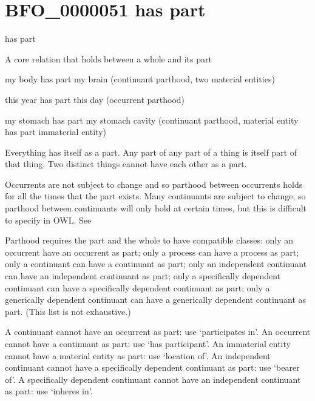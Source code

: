 \documentclass[letterpaper,10pt,english]{sphinxmanual}
\begin{document}
\section{BFO\_0000051 \sphinxhyphen{} has part}
\label{\detokenize{doc-BFO_0000051:bfo-0000051-has-part}}\label{\detokenize{doc-BFO_0000051:index-0}}\label{\detokenize{doc-BFO_0000051::doc}}
\begin{sphinxShadowBox}

\sphinxAtStartPar
has part
\end{sphinxShadowBox}

\begin{sphinxShadowBox}

\sphinxAtStartPar
A core relation that holds between a whole and its part
\end{sphinxShadowBox}

\begin{sphinxShadowBox}

\sphinxAtStartPar
my body has part my brain (continuant parthood, two material entities)

\sphinxAtStartPar
this year has part this day (occurrent parthood)

\sphinxAtStartPar
my stomach has part my stomach cavity (continuant parthood, material entity has part immaterial entity)
\end{sphinxShadowBox}

\begin{sphinxShadowBox}

\sphinxAtStartPar
Everything has itself as a part. Any part of any part of a thing is itself part of that thing. Two distinct things cannot have each other as a part.

\sphinxAtStartPar
Occurrents are not subject to change and so parthood between occurrents holds for all the times that the part exists. Many continuants are subject to change, so parthood between continuants will only hold at certain times, but this is difficult to specify in OWL. See 

\sphinxAtStartPar
Parthood requires the part and the whole to have compatible classes: only an occurrent have an occurrent as part; only a process can have a process as part; only a continuant can have a continuant as part; only an independent continuant can have an independent continuant as part; only a specifically dependent continuant can have a specifically dependent continuant as part; only a generically dependent continuant can have a generically dependent continuant as part. (This list is not exhaustive.)

\sphinxAtStartPar
A continuant cannot have an occurrent as part: use ‘participates in’. An occurrent cannot have a continuant as part: use ‘has participant’. An immaterial entity cannot have a material entity as part: use ‘location of’. An independent continuant cannot have a specifically dependent continuant as part: use ‘bearer of’. A specifically dependent continuant cannot have an independent continuant as part: use ‘inheres in’.
\end{sphinxShadowBox}
\end{document}
